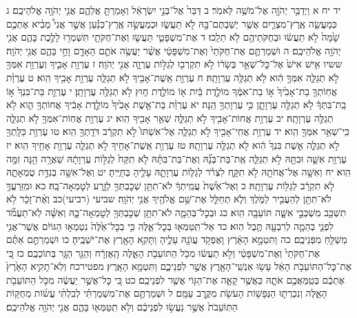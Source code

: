\documentclass[twoside, openany, parskip=half, 11pt]{book}
\begin{document}
יד יח א וַיְדַבֵּ֥ר יְהֹוָ֖ה אֶל־מֹשֶׁ֥ה לֵּאמֹֽר׃ ב דַּבֵּר֙ אֶל־בְּנֵ֣י יִשְׂרָאֵ֔ל וְאָמַרְתָּ֖ אֲלֵהֶ֑ם אֲנִ֖י יְהֹוָ֥ה אֱלֹהֵיכֶֽם׃ ג כְּמַעֲשֵׂ֧ה אֶֽרֶץ־מִצְרַ֛יִם אֲשֶׁ֥ר יְשַׁבְתֶּם־בָּ֖הּ לֹ֣א תַעֲשׂ֑וּ וּכְמַעֲשֵׂ֣ה אֶֽרֶץ־כְּנַ֡עַן אֲשֶׁ֣ר אֲנִי֩ מֵבִ֨יא אֶתְכֶ֥ם שָׁ֙מָּה֙ לֹ֣א תַעֲשׂ֔וּ וּבְחֻקֹּתֵיהֶ֖ם לֹ֥א תֵלֵֽכוּ׃ ד אֶת־מִשְׁפָּטַ֧י תַּעֲשׂ֛וּ וְאֶת־חֻקֹּתַ֥י תִּשְׁמְר֖וּ לָלֶ֣כֶת בָּהֶ֑ם אֲנִ֖י יְהֹוָ֥ה אֱלֹהֵיכֶֽם׃ ה וּשְׁמַרְתֶּ֤ם אֶת־חֻקֹּתַי֙ וְאֶת־מִשְׁפָּטַ֔י אֲשֶׁ֨ר יַעֲשֶׂ֥ה אֹתָ֛ם הָאָדָ֖ם וָחַ֣י בָּהֶ֑ם אֲנִ֖י יְהֹוָֽה׃
ששיו אִ֥ישׁ אִישׁ֙ אֶל־כׇּל־שְׁאֵ֣ר בְּשָׂר֔וֹ לֹ֥א תִקְרְב֖וּ לְגַלּ֣וֹת עֶרְוָ֑ה אֲנִ֖י יְהֹוָֽה׃
ז עֶרְוַ֥ת אָבִ֛יךָ וְעֶרְוַ֥ת אִמְּךָ֖ לֹ֣א תְגַלֵּ֑ה אִמְּךָ֣ הִ֔וא לֹ֥א תְגַלֶּ֖ה עֶרְוָתָֽהּ׃
ח עֶרְוַ֥ת אֵֽשֶׁת־אָבִ֖יךָ לֹ֣א תְגַלֵּ֑ה עֶרְוַ֥ת אָבִ֖יךָ הִֽוא׃
ט עֶרְוַ֨ת אֲחֽוֹתְךָ֤ בַת־אָבִ֙יךָ֙ א֣וֹ בַת־אִמֶּ֔ךָ מוֹלֶ֣דֶת בַּ֔יִת א֖וֹ מוֹלֶ֣דֶת ח֑וּץ לֹ֥א תְגַלֶּ֖ה עֶרְוָתָֽן׃
י עֶרְוַ֤ת בַּת־בִּנְךָ֙ א֣וֹ בַֽת־בִּתְּךָ֔ לֹ֥א תְגַלֶּ֖ה עֶרְוָתָ֑ן כִּ֥י עֶרְוָתְךָ֖ הֵֽנָּה׃
יא עֶרְוַ֨ת בַּת־אֵ֤שֶׁת אָבִ֙יךָ֙ מוֹלֶ֣דֶת אָבִ֔יךָ אֲחוֹתְךָ֖ הִ֑וא לֹ֥א תְגַלֶּ֖ה עֶרְוָתָֽהּ׃
יב עֶרְוַ֥ת אֲחוֹת־אָבִ֖יךָ לֹ֣א תְגַלֵּ֑ה שְׁאֵ֥ר אָבִ֖יךָ הִֽוא׃
יג עֶרְוַ֥ת אֲחֽוֹת־אִמְּךָ֖ לֹ֣א תְגַלֵּ֑ה כִּֽי־שְׁאֵ֥ר אִמְּךָ֖ הִֽוא׃
יד עֶרְוַ֥ת אֲחִֽי־אָבִ֖יךָ לֹ֣א תְגַלֵּ֑ה אֶל־אִשְׁתּוֹ֙ לֹ֣א תִקְרָ֔ב דֹּדָֽתְךָ֖ הִֽוא׃
טו עֶרְוַ֥ת כַּלָּֽתְךָ֖ לֹ֣א תְגַלֵּ֑ה אֵ֤שֶׁת בִּנְךָ֙ הִ֔וא לֹ֥א תְגַלֶּ֖ה עֶרְוָתָֽהּ׃
טז עֶרְוַ֥ת אֵֽשֶׁת־אָחִ֖יךָ לֹ֣א תְגַלֵּ֑ה עֶרְוַ֥ת אָחִ֖יךָ הִֽוא׃
יז עֶרְוַ֥ת אִשָּׁ֛ה וּבִתָּ֖הּ לֹ֣א תְגַלֵּ֑ה אֶֽת־בַּת־בְּנָ֞הּ וְאֶת־בַּת־בִּתָּ֗הּ לֹ֤א תִקַּח֙ לְגַלּ֣וֹת עֶרְוָתָ֔הּ שַׁאֲרָ֥ה הֵ֖נָּה זִמָּ֥ה הִֽוא׃ יח וְאִשָּׁ֥ה אֶל־אֲחֹתָ֖הּ לֹ֣א תִקָּ֑ח לִצְרֹ֗ר לְגַלּ֧וֹת עֶרְוָתָ֛הּ עָלֶ֖יהָ בְּחַיֶּֽיהָ׃ יט וְאֶל־אִשָּׁ֖ה בְּנִדַּ֣ת טֻמְאָתָ֑הּ לֹ֣א תִקְרַ֔ב לְגַלּ֖וֹת עֶרְוָתָֽהּ׃ כ וְאֶל־אֵ֙שֶׁת֙ עֲמִֽיתְךָ֔ לֹא־תִתֵּ֥ן שְׁכׇבְתְּךָ֖ לְזָ֑רַע לְטׇמְאָה־בָֽהּ׃ כא וּמִֽזַּרְעֲךָ֥ לֹא־תִתֵּ֖ן לְהַעֲבִ֣יר לַמֹּ֑לֶךְ וְלֹ֧א תְחַלֵּ֛ל אֶת־שֵׁ֥ם אֱלֹהֶ֖יךָ אֲנִ֥י יְהֹוָֽה׃ שביעי (רביעי)כב וְאֶ֨ת־זָכָ֔ר לֹ֥א תִשְׁכַּ֖ב מִשְׁכְּבֵ֣י אִשָּׁ֑ה תּוֹעֵבָ֖ה הִֽוא׃ כג וּבְכׇל־בְּהֵמָ֛ה לֹא־תִתֵּ֥ן שְׁכׇבְתְּךָ֖ לְטׇמְאָה־בָ֑הּ וְאִשָּׁ֗ה לֹֽא־תַעֲמֹ֞ד לִפְנֵ֧י בְהֵמָ֛ה לְרִבְעָ֖הּ תֶּ֥בֶל הֽוּא׃ כד אַל־תִּֽטַּמְּא֖וּ בְּכׇל־אֵ֑לֶּה כִּ֤י בְכׇל־אֵ֙לֶּה֙ נִטְמְא֣וּ הַגּוֹיִ֔ם אֲשֶׁר־אֲנִ֥י מְשַׁלֵּ֖חַ מִפְּנֵיכֶֽם׃ כה וַתִּטְמָ֣א הָאָ֔רֶץ וָאֶפְקֹ֥ד עֲוֺנָ֖הּ עָלֶ֑יהָ וַתָּקִ֥א הָאָ֖רֶץ אֶת־יֹשְׁבֶֽיהָ׃ כו וּשְׁמַרְתֶּ֣ם אַתֶּ֗ם אֶת־חֻקֹּתַי֙ וְאֶת־מִשְׁפָּטַ֔י וְלֹ֣א תַעֲשׂ֔וּ מִכֹּ֥ל הַתּוֹעֵבֹ֖ת הָאֵ֑לֶּה הָֽאֶזְרָ֔ח וְהַגֵּ֖ר הַגָּ֥ר בְּתוֹכְכֶֽם׃ כז כִּ֚י אֶת־כׇּל־הַתּוֹעֵבֹ֣ת הָאֵ֔ל עָשׂ֥וּ אַנְשֵֽׁי־הָאָ֖רֶץ אֲשֶׁ֣ר לִפְנֵיכֶ֑ם וַתִּטְמָ֖א הָאָֽרֶץ׃ מפטירכח וְלֹֽא־תָקִ֤יא הָאָ֙רֶץ֙ אֶתְכֶ֔ם בְּטַֽמַּאֲכֶ֖ם אֹתָ֑הּ כַּאֲשֶׁ֥ר קָאָ֛ה אֶת־הַגּ֖וֹי אֲשֶׁ֥ר לִפְנֵיכֶֽם׃ כט כִּ֚י כׇּל־אֲשֶׁ֣ר יַעֲשֶׂ֔ה מִכֹּ֥ל הַתּוֹעֵבֹ֖ת הָאֵ֑לֶּה וְנִכְרְת֛וּ הַנְּפָשׁ֥וֹת הָעֹשֹׂ֖ת מִקֶּ֥רֶב עַמָּֽם׃ ל וּשְׁמַרְתֶּ֣ם אֶת־מִשְׁמַרְתִּ֗י לְבִלְתִּ֨י עֲשׂ֜וֹת מֵחֻקּ֤וֹת הַתּֽוֹעֵבֹת֙ אֲשֶׁ֣ר נַעֲשׂ֣וּ לִפְנֵיכֶ֔ם וְלֹ֥א תִֽטַּמְּא֖וּ בָּהֶ֑ם אֲנִ֖י יְהֹוָ֥ה אֱלֹהֵיכֶֽם׃
\end{document}

